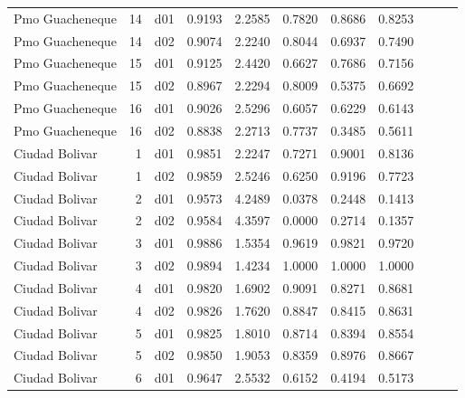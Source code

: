 \begin{landscape}
\begin{longtable}{p{2cm}rrrrrrrrrr}
      Pmo Guacheneque  &         14 &     d01 &   0.9193 &  2.2585 &        0.7820 &           0.8686 &  0.8253 \\
      Pmo Guacheneque  &         14 &     d02 &   0.9074 &  2.2240 &        0.8044 &           0.6937 &  0.7490 \\
      Pmo Guacheneque  &         15 &     d01 &   0.9125 &  2.4420 &        0.6627 &           0.7686 &  0.7156 \\
      Pmo Guacheneque  &         15 &     d02 &   0.8967 &  2.2294 &        0.8009 &           0.5375 &  0.6692 \\
      Pmo Guacheneque  &         16 &     d01 &   0.9026 &  2.5296 &        0.6057 &           0.6229 &  0.6143 \\
      Pmo Guacheneque  &         16 &     d02 &   0.8838 &  2.2713 &        0.7737 &           0.3485 &  0.5611 \\
       Ciudad Bolivar  &          1 &     d01 &   0.9851 &  2.2247 &        0.7271 &           0.9001 &  0.8136 \\
       Ciudad Bolivar  &          1 &     d02 &   0.9859 &  2.5246 &        0.6250 &           0.9196 &  0.7723 \\
       Ciudad Bolivar  &          2 &     d01 &   0.9573 &  4.2489 &        0.0378 &           0.2448 &  0.1413 \\
       Ciudad Bolivar  &          2 &     d02 &   0.9584 &  4.3597 &        0.0000 &           0.2714 &  0.1357 \\
       Ciudad Bolivar  &          3 &     d01 &   0.9886 &  1.5354 &        0.9619 &           0.9821 &  0.9720 \\
       Ciudad Bolivar  &          3 &     d02 &   0.9894 &  1.4234 &        1.0000 &           1.0000 &  1.0000 \\
       Ciudad Bolivar  &          4 &     d01 &   0.9820 &  1.6902 &        0.9091 &           0.8271 &  0.8681 \\
       Ciudad Bolivar  &          4 &     d02 &   0.9826 &  1.7620 &        0.8847 &           0.8415 &  0.8631 \\
       Ciudad Bolivar  &          5 &     d01 &   0.9825 &  1.8010 &        0.8714 &           0.8394 &  0.8554 \\
       Ciudad Bolivar  &          5 &     d02 &   0.9850 &  1.9053 &        0.8359 &           0.8976 &  0.8667 \\
       Ciudad Bolivar  &          6 &     d01 &   0.9647 &  2.5532 &        0.6152 &           0.4194 &  0.5173 \\

\end{longtable}
\end{landscape}
